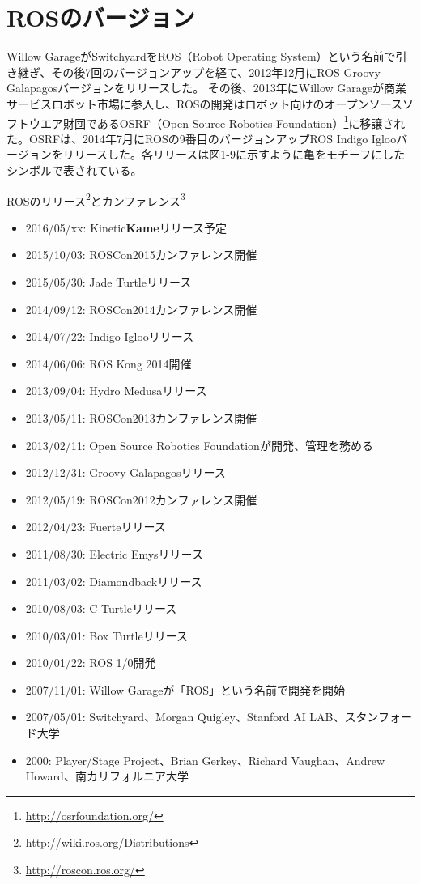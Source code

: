 {{%
\section{ROSのバージョン}

Willow GarageがSwitchyardをROS（Robot Operating System）という名前で引き継ぎ、その後7回のバージョンアップを経て、2012年12月にROS Groovy Galapagosバージョンをリリースした。
その後、2013年にWillow Garageが商業サービスロボット市場に参入し、ROSの開発はロボット向けのオープンソースソフトウエア財団であるOSRF（Open Source Robotics Foundation）\footnote{\url{http://osrfoundation.org/}}に移譲された。OSRFは、2014年7月にROSの9番目のバージョンアップROS Indigo Iglooバージョンをリリースした。各リリースは図1-9に示すように亀をモチーフにしたシンボルで表されている。

ROSのリリース\footnote{\url{http://wiki.ros.org/Distributions}}とカンファレンス\footnote{\url{http://roscon.ros.org/}}
\begin{itemize}
\item  2016/05/xx: Kinetic\textbf{Kame}リリース予定
\item  2015/10/03: ROSCon2015カンファレンス開催
\item  2015/05/30: Jade Turtleリリース
\item  2014/09/12: ROSCon2014カンファレンス開催
\item  2014/07/22: Indigo Iglooリリース
\item  2014/06/06: ROS Kong 2014開催
\item  2013/09/04: Hydro Medusaリリース
\item  2013/05/11: ROSCon2013カンファレンス開催
\item  2013/02/11: Open Source Robotics Foundationが開発、管理を務める
\item  2012/12/31: Groovy Galapagosリリース
\item  2012/05/19: ROSCon2012カンファレンス開催
\item  2012/04/23: Fuerteリリース
\item  2011/08/30: Electric Emysリリース
\item  2011/03/02: Diamondbackリリース
\item  2010/08/03: C Turtleリリース
\item  2010/03/01: Box Turtleリリース
\item  2010/01/22: ROS 1/0開発
\item  2007/11/01: Willow Garageが「ROS」という名前で開発を開始
\item  2007/05/01: Switchyard、Morgan Quigley、Stanford AI LAB、スタンフォード大学
\item  2000: Player/Stage Project、Brian Gerkey、Richard Vaughan、Andrew Howard、南カリフォルニア大学
\end{itemize}


}}
